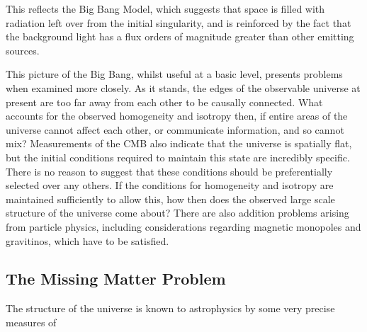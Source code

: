 This reflects the Big Bang Model, which suggests that space is filled with radiation left over from the initial singularity, and is reinforced by the fact that the background light has a flux orders of magnitude greater than other emitting sources.
\par This picture of the Big Bang, whilst useful at a basic level, presents problems when examined more closely. As it stands, the edges of the observable universe at present are too far away from each other to be causally connected. What accounts for the observed homogeneity and isotropy then, if entire areas of the universe cannot affect each other, or communicate information, and so cannot mix? Measurements of the CMB also indicate that the universe is spatially flat, but the initial conditions required to maintain this state are incredibly specific. There is no reason to suggest that these conditions should be preferentially selected over any others. If the conditions for homogeneity and isotropy are maintained sufficiently to allow this, how then does the observed large scale structure of the universe come about? There are also addition problems arising from particle physics, including considerations regarding magnetic monopoles and gravitinos, which have to be satisfied.

\subsection{The Missing Matter Problem}
The structure of the universe is known to astrophysics by some very precise measures of 
